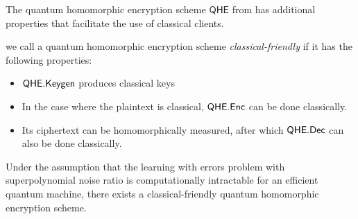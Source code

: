 The quantum homomorphic encryption scheme $\mathsf{QHE}$ from \cite{mahadev_qfhe} has additional properties that facilitate the use of classical clients.

\begin{definition}
	we call a quantum homomorphic encryption scheme \emph{classical-friendly} if it has the following properties:
	\begin{itemize}
		\item $\mathsf{QHE.Keygen}$ produces classical keys
		\item In the case where the plaintext is classical, $\mathsf{QHE.Enc}$ can be done classically.
		\item Its ciphertext can be homomorphically measured, after which $\mathsf{QHE.Dec}$ can also be done classically. 
	\end{itemize}
\end{definition}

\begin{theorem} 
	Under the assumption that the learning with errors problem with superpolynomial noise ratio is computationally intractable for an efficient quantum machine,
	there exists a classical-friendly quantum homomorphic encryption scheme.
\end{theorem}
